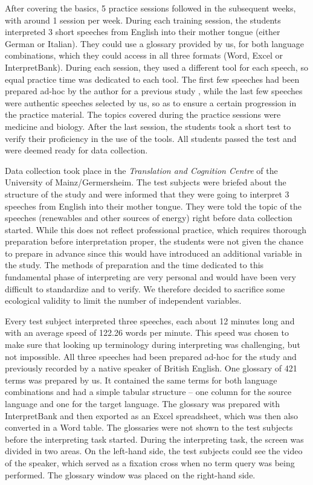 \documentclass[output=paper]{langsci/langscibook}
\begin{document}
After covering the basics, 5 practice sessions followed in the subsequent weeks, with around 1 session per week. During each training session, the students interpreted 3 short speeches from English into their mother tongue (either German or Italian). They could use a glossary provided by us, for both language combinations, which they could access in all three formats (Word, Excel or InterpretBank). During each session, they used a different tool for each speech, so equal practice time was dedicated to each tool. The first few speeches had been prepared ad-hoc by the author for a previous study \citep{Prandi2015a, Prandi2015b}, while the last few speeches were authentic speeches selected by us, so as to ensure a certain progression in the practice material. The topics covered during the practice sessions were medicine and biology. After the last session, the students took a short test to verify their proficiency in the use of the tools. All students passed the test and were deemed ready for data collection.

Data collection took place in the \textit{Translation and Cognition Centre} of the University of Mainz/Germersheim. The test subjects were briefed about the structure of the study and were informed that they were going to interpret 3 speeches from English into their mother tongue. They were told the topic of the speeches (renewables and other sources of energy) right before data collection started. While this does not reflect professional practice, which requires thorough preparation before interpretation proper, the students were not given the chance to prepare in advance since this would have introduced an additional variable in the study. The methods of preparation and the time dedicated to this fundamental phase of interpreting are very personal and would have been very difficult to standardize and to verify. We therefore decided to sacrifice some ecological validity to limit the number of independent variables.

Every test subject interpreted three speeches, each about 12 minutes long and with an average speed of 122.26 words per minute. This speed was chosen to make sure that looking up terminology during interpreting was challenging, but not impossible. All three speeches had been prepared ad-hoc for the study and previously recorded by a native speaker of British English. One glossary of 421 terms was prepared by us. It contained the same terms for both language combinations and had a simple tabular structure – one column for the source language and one for the target language. The glossary was prepared with InterpretBank and then exported as an Excel spreadsheet, which was then also converted in a Word table. The glossaries were not shown to the test subjects before the interpreting task started. During the interpreting task, the screen was divided in two areas. On the left-hand side, the test subjects could see the video of the speaker, which served as a fixation cross when no term query was being performed. The glossary window was placed on the right-hand side.
\end{document}
